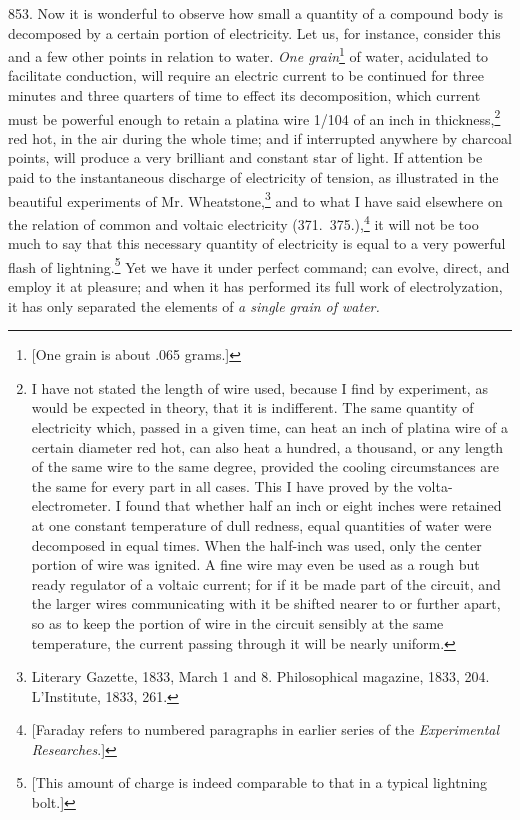 853. Now it is wonderful to observe how small a quantity of a compound
body is de\-com\-posed by a certain portion of electricity. Let us, for
instance, consider this and a few other points in relation to water.
\emph{One grain}\footnote{{[}One grain is about .065 grams.{]}} of
water, acidulated to facilitate conduction, will require an electric
current to be continued for three minutes and three quarters of time to
effect its de\-com\-po\-si\-tion, which current must be powerful enough to
retain a platina wire 1/104 of an inch in thickness,\footnote{I have not
  stated the length of wire used, because I find by experiment, as would
  be expected in theory, that it is indifferent. The same quantity of
  electricity which, passed in a given time, can heat an inch of platina
  wire of a certain diameter red hot, can also heat a hundred, a
  thousand, or any length of the same wire to the same degree, provided
  the cooling circumstances are the same for every part in all cases.
  This I have proved by the volta-electrometer. I found that whether
  half an inch or eight inches were retained at one constant temperature
  of dull redness, equal quantities of water were de\-com\-posed in equal
  times. When the half-inch was used, only the center portion of wire
  was ignited. A fine wire may even be used as a rough but ready
  regulator of a voltaic current; for if it be made part of the circuit,
  and the larger wires communicating with it be shifted nearer to or
  further apart, so as to keep the portion of wire in the circuit
  sensibly at the same temperature, the current passing through it will
  be nearly uniform.} red hot, in the air during the whole time; and if
interrupted anywhere by charcoal points, will produce a very brilliant
and constant star of light. If attention be paid to the instantaneous
discharge of electricity of tension, as illustrated in the beautiful
experiments of Mr. Wheatstone,\footnote{Literary Gazette, 1833, March 1
  and 8. Philosophical magazine, 1833, 204. L'Institute, 1833, 261.}
and to what I have said elsewhere on the relation of common and voltaic
electricity (371.\ 375.),\footnote{{[}Faraday refers to numbered
  paragraphs in earlier series of the \emph{Experimental Researches}.{]}}
it will not be too much to say that this necessary quantity of
electricity is equal to a very powerful flash of lightning.\footnote{{[}This
  amount of charge is indeed comparable to that in a typical lightning
  bolt.{]}} Yet we have it under perfect command; can evolve, direct,
and employ it at pleasure; and when it has performed its full work of
electrolyzation, it has only separated the elements of \emph{a single
grain of water.}

